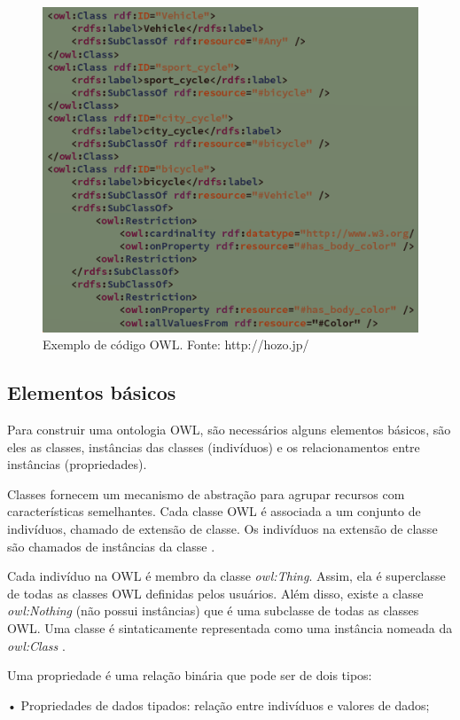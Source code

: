 \documentclass{bcc}
\begin{document}
\begin{figure}[H]
\centering
\includegraphics[width=.9\textwidth]{Figuras/codigo_owl.png}
\caption{Exemplo de código OWL. Fonte: http://hozo.jp/}
\label{fig:codowl}
\end{figure}

\subsection{Elementos básicos}
 
Para construir uma ontologia OWL, são necessários alguns elementos básicos, são eles as classes, instâncias das classes (indivíduos) e os relacionamentos entre instâncias (propriedades).
 
Classes fornecem um mecanismo de abstração para agrupar recursos com características semelhantes. Cada classe OWL é associada a um conjunto de indivíduos, chamado de extensão de classe. Os indivíduos na extensão de classe são chamados de instâncias da classe \cite{mcguinness}. 

Cada indivíduo na OWL é membro da classe \textit{owl:Thing}. Assim, ela é superclasse de todas as classes OWL definidas pelos usuários. Além disso, existe a classe \textit{owl:Nothing} (não possui instâncias) que é uma subclasse de todas as classes OWL. Uma classe é sintaticamente representada como uma instância nomeada da \textit{owl:Class} \cite{de2005}.

Uma propriedade é uma relação binária que pode ser de dois tipos:

• Propriedades de dados tipados: relação entre indivíduos e valores
de dados;
\end{document}
